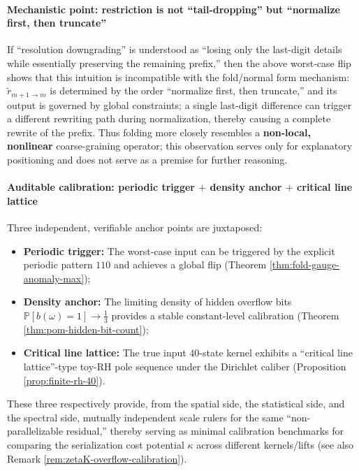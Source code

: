 \paragraph{Mechanistic point: restriction is not ``tail-dropping'' but ``normalize first, then truncate''}
If ``resolution downgrading'' is understood as ``losing only the last-digit details while essentially preserving the remaining prefix,'' then the above worst-case flip shows that this intuition is incompatible with the fold/normal form mechanism: \(\widetilde r_{m+1\to m}\) is determined by the order ``normalize first, then truncate,'' and its output is governed by global constraints; a single last-digit difference can trigger a different rewriting path during normalization, thereby causing a complete rewrite of the prefix.
Thus folding more closely resembles a \textbf{non-local, nonlinear} coarse-graining operator; this observation serves only for explanatory positioning and does not serve as a premise for further reasoning.

\paragraph{Auditable calibration: periodic trigger \texorpdfstring{$+$}{+} density anchor \texorpdfstring{$+$}{+} critical line lattice}
Three independent, verifiable anchor points are juxtaposed:
\begin{itemize}
  \item \textbf{Periodic trigger:} The worst-case input can be triggered by the explicit periodic pattern \(110\) and achieves a global flip (Theorem \ref{thm:fold-gauge-anomaly-max});
  \item \textbf{Density anchor:} The limiting density of hidden overflow bits \(\mathbb{P}[b(\omega)=1]\to \frac13\) provides a stable constant-level calibration (Theorem \ref{thm:pom-hidden-bit-count});
  \item \textbf{Critical line lattice:} The true input \(40\)-state kernel exhibits a ``critical line lattice''-type toy-RH pole sequence under the Dirichlet caliber (Proposition \ref{prop:finite-rh-40}).
\end{itemize}
These three respectively provide, from the spatial side, the statistical side, and the spectral side, mutually independent scale rulers for the same ``non-parallelizable residual,'' thereby serving as minimal calibration benchmarks for comparing the serialization cost potential \(\kappa\) across different kernels/lifts (see also Remark \ref{rem:zetaK-overflow-calibration}).

